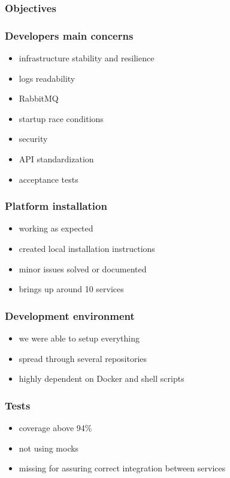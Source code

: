 \documentclass{beamer}
\begin{document}
  \begin{frame}
    \frametitle{Objectives}
  \end{frame}

  \begin{frame}
    \frametitle{Developers main concerns}

    \begin{itemize}
      \item infrastructure stability and resilience
      \item logs readability
      \item RabbitMQ
      \item startup race conditions
      \item security
      \item API standardization
      \item acceptance tests
    \end{itemize}
  \end{frame}

  \begin{frame}
    \frametitle{Platform installation}

    \begin{itemize}
      \item working as expected
      \item created local installation instructions
      \item minor issues solved or documented
      \item brings up around 10 services
    \end{itemize}
  \end{frame}

  \begin{frame}
    \frametitle{Development environment}

    \begin{itemize}
      \item we were able to setup everything
      \item spread through several repositories
      \item highly dependent on Docker and shell scripts
    \end{itemize}
  \end{frame}

  \begin{frame}
    \frametitle{Tests}

    \begin{itemize}
      \item coverage above 94\%
      \item not using mocks
      \item missing for assuring correct integration between services
    \end{itemize}
  \end{frame}
\end{document}
